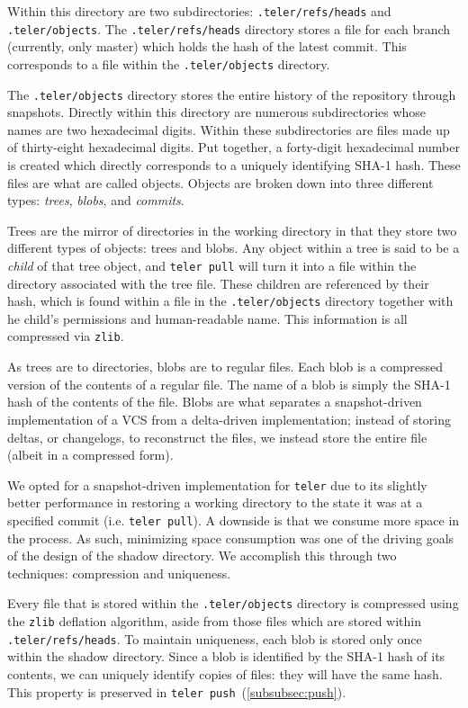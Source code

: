 \documentclass[12pt, letterpaper]{article}
\begin{document}
\begin{multicols}{2}
  Within this directory are two subdirectories:
  \texttt{.teler/refs/heads} and \texttt{.teler/objects}. The
  \texttt{.teler/refs/heads} directory stores a file for each branch
  (currently, only master) which holds the hash of the latest
  commit. This corresponds to a file within the
  \texttt{.teler/objects} directory.

  The \texttt{.teler/objects} directory stores the entire history of
  the repository through snapshots. Directly within this directory are
  numerous subdirectories whose names are two hexadecimal digits.
  Within these subdirectories are files made up of thirty-eight
  hexadecimal digits. Put together, a forty-digit hexadecimal number
  is created which directly corresponds to a uniquely identifying
  SHA-1 hash. These files are what are called objects. Objects are
  broken down into three different types: \textit{trees},
  \textit{blobs}, and \textit{commits}.

  Trees are the mirror of directories in the working directory in that
  they store two different types of objects: trees and blobs. Any
  object within a tree is said to be a \textit{child} of that tree
  object, and \texttt{teler pull} will turn it into a file within the
  directory associated with the tree file. These children
  are referenced by their hash, which is found within a file in the
  \texttt{.teler/objects} directory together with he child's permissions
  and human-readable name. This information is all compressed via
  \texttt{zlib}.

  As trees are to directories, blobs are to regular files. Each blob
  is a compressed version of the contents of a regular file. The name
  of a blob is simply the SHA-1 hash of the contents of the file.
  Blobs are what separates a snapshot-driven implementation of a VCS
  from a delta-driven implementation; instead of storing deltas, or
  changelogs, to reconstruct the files, we instead store the entire
  file (albeit in a compressed form).

  We opted for a snapshot-driven implementation for \texttt{teler} due
  to its slightly better performance in restoring a working directory
  to the state it was at a specified commit (i.e. \texttt{teler
    pull}). A downside is that we consume more space in the process. As
  such, minimizing space consumption was one of the driving goals of
  the design of the shadow directory. We accomplish this through two
  techniques: compression and uniqueness.

  Every file that is stored within the \texttt{.teler/objects}
  directory is compressed using the \texttt{zlib} deflation algorithm,
  aside from those files which are stored within
  \texttt{.teler/refs/heads}. To maintain uniqueness, each blob is
  stored only once within the shadow directory. Since a blob is
  identified by the SHA-1 hash of its contents, we can uniquely identify
  copies of files: they will have the same hash. This property is preserved
  in \texttt{teler push}~(\ref{subsubsec:push}).


\end{multicols}
\end{document}
